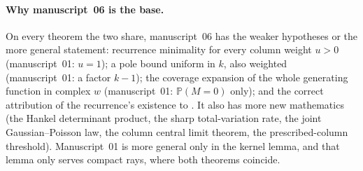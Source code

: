 \documentclass[11pt]{article}
\numberwithin{equation}{section}
\theoremstyle{definition}
\theoremstyle{remark}
\newcommand{\Pp}{\mathbb P}
\begin{document}
\paragraph{Why manuscript~06 is the base.} On every theorem the two share,
manuscript~06 has the weaker hypotheses or the more general statement:
recurrence minimality for every column weight $u>0$ (manuscript~01:
$u=1$); a pole bound uniform in $k$, also weighted (manuscript~01: a
factor $k-1$); the coverage expansion of the whole generating function
in complex $w$ (manuscript~01: $\Pp(M=0)$ only); and the correct
attribution of the recurrence's existence to \cite[Proposition~25]{mpr2009}.
It also has more new mathematics (the Hankel determinant product, the
sharp total-variation rate, the joint Gaussian--Poisson law, the column
central limit theorem, the prescribed-column threshold). Manuscript~01 is
more general only in the kernel lemma, and that lemma only serves compact
rays, where both theorems coincide.
\end{document}
